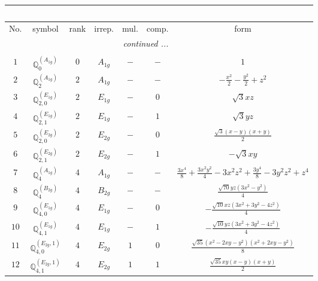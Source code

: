\documentclass[fleqn,10pt,landscape]{article}
\begin{document}
\begin{itemize}
\begin{center}
\begin{longtable}{ccccccc}
\multicolumn{6}{l}{\tablename\ \thetable{}} \\
 \hline \hline
No. & symbol & rank & irrep. & mul. & comp. & form \\ \hline \endhead

 \hline \hline
\multicolumn{6}{r}{\footnotesize\it continued ...} \\ \endfoot

 \hline \hline
\multicolumn{6}{r}{} \\ \endlastfoot

$ 1 $ & $ \mathbb{Q}_{0}^{(A_{1g})} $ & $ 0 $ & $ A_{1g} $ & $ - $ & $ - $ & $ 1 $ \\ \hline
$ 2 $ & $ \mathbb{Q}_{2}^{(A_{1g})} $ & $ 2 $ & $ A_{1g} $ & $ - $ & $ - $ & $ - \frac{x^{2}}{2} - \frac{y^{2}}{2} + z^{2} $ \\
$ 3 $ & $ \mathbb{Q}_{2,0}^{(E_{1g})} $ & $ 2 $ & $ E_{1g} $ & $ - $ & $ 0 $ & $ \sqrt{3} x z $ \\
$ 4 $ & $ \mathbb{Q}_{2,1}^{(E_{1g})} $ & $ 2 $ & $ E_{1g} $ & $ - $ & $ 1 $ & $ \sqrt{3} y z $ \\
$ 5 $ & $ \mathbb{Q}_{2,0}^{(E_{2g})} $ & $ 2 $ & $ E_{2g} $ & $ - $ & $ 0 $ & $ \frac{\sqrt{3} \left(x - y\right) \left(x + y\right)}{2} $ \\
$ 6 $ & $ \mathbb{Q}_{2,1}^{(E_{2g})} $ & $ 2 $ & $ E_{2g} $ & $ - $ & $ 1 $ & $ - \sqrt{3} x y $ \\ \hline
$ 7 $ & $ \mathbb{Q}_{4}^{(A_{1g})} $ & $ 4 $ & $ A_{1g} $ & $ - $ & $ - $ & $ \frac{3 x^{4}}{8} + \frac{3 x^{2} y^{2}}{4} - 3 x^{2} z^{2} + \frac{3 y^{4}}{8} - 3 y^{2} z^{2} + z^{4} $ \\
$ 8 $ & $ \mathbb{Q}_{4}^{(B_{2g})} $ & $ 4 $ & $ B_{2g} $ & $ - $ & $ - $ & $ \frac{\sqrt{70} y z \left(3 x^{2} - y^{2}\right)}{4} $ \\
$ 9 $ & $ \mathbb{Q}_{4,0}^{(E_{1g})} $ & $ 4 $ & $ E_{1g} $ & $ - $ & $ 0 $ & $ - \frac{\sqrt{10} x z \left(3 x^{2} + 3 y^{2} - 4 z^{2}\right)}{4} $ \\
$ 10 $ & $ \mathbb{Q}_{4,1}^{(E_{1g})} $ & $ 4 $ & $ E_{1g} $ & $ - $ & $ 1 $ & $ - \frac{\sqrt{10} y z \left(3 x^{2} + 3 y^{2} - 4 z^{2}\right)}{4} $ \\
$ 11 $ & $ \mathbb{Q}_{4,0}^{(E_{2g},1)} $ & $ 4 $ & $ E_{2g} $ & $ 1 $ & $ 0 $ & $ \frac{\sqrt{35} \left(x^{2} - 2 x y - y^{2}\right) \left(x^{2} + 2 x y - y^{2}\right)}{8} $ \\
$ 12 $ & $ \mathbb{Q}_{4,1}^{(E_{2g},1)} $ & $ 4 $ & $ E_{2g} $ & $ 1 $ & $ 1 $ & $ \frac{\sqrt{35} x y \left(x - y\right) \left(x + y\right)}{2} $ \\

\end{longtable}
\end{center}
\end{itemize}
\end{document}
